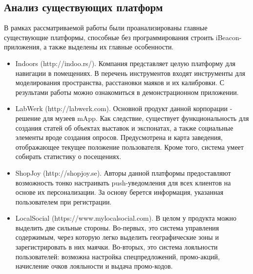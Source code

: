 \subsection{Анализ существующих платформ}

В рамках рассматриваемой работы были проанализированы главные существующие платформы, способные без программирования строить iBeacon-приложения, а также выделены их главные особенности.

\begin{itemize}
    \item
    Indoors (http://indoo.rs/). Компания представляет целую платформу для навигации в помещениях. В перечень инструментов входят инструменты для моделирования пространства, расстановки маяков и их калибровки. С результами работы можно ознакомиться в демонстрационном приложении.
    \item
    LabWerk (http://labwerk.com). Основной продукт данной корпорации - решение для музеев mApp. Как следствие, существует функциональность для создания статей об объектах выставок и экспонатах, а также социальные элементы вроде создания опросов. Предусмотрена и карта заведения, отображающее текущее положение пользователя. Кроме того, система умеет собирать статистику о посещениях.
    \item
    ShopJoy (http://shopjoy.se). Авторы данной платформы предоставляют возможность тонко настраивать push-уведомления для всех клиентов на основе их персонализации. За основу берется информация, указанная пользователем при регистрации.
    \item
    LocalSocial (https://www.mylocalsocial.com). В целом у продукта можно выделить две сильные стороны. Во-первых, это система управления содержимым, через которую легко выделить географические зоны и зарегистрировать в них маячки. Во-вторых, это система лояльности пользователей: возможна настройка спец\-пред\-ло\-же\-ний, промо-акций, начисление очков лояльности и выдача промо-кодов.
\end{itemize}